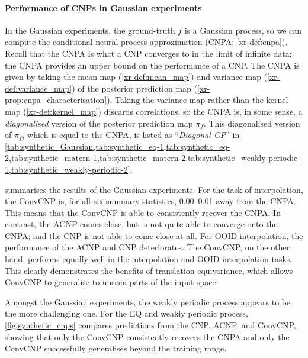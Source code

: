 \documentclass[12pt, twoside]{report}
\newcommand{\xrprefix}[1]{xr-#1}
\begin{document}
\afterpage{\FloatBarrier}

\paragraph{Performance of CNPs in Gaussian experiments}
In the Gaussian experiments, the ground-truth $f$ is a Gaussian process, so we can compute the conditional neural process approximation (CNPA; \cref{\xrprefix{def:cnpa}}).
Recall that the CNPA is what a CNP converges to in the limit of infinite data;
the CNPA provides an upper bound on the performance of a CNP.
The CNPA is given by taking the mean map (\cref{\xrprefix{def:mean_map}}) and variance map (\cref{\xrprefix{def:variance_map}}) of the posterior prediction map (\cref{\xrprefix{prop:cnpa_characterisation}}). 
Taking the variance map rather than the kernel map (\cref{\xrprefix{def:kernel_map}}) discards correlations,
so the CNPA is, in some sense, a \emph{diagonalised} version of the posterior prediction map $\pi_f$.
This diagonalised version of $\pi_f$, which is equal to the CNPA, is listed as ``\emph{Diagonal GP}'' in \cref{tab:synthetic_Gaussian,tab:synthetic_eq-1,tab:synthetic_eq-2,tab:synthetic_matern-1,tab:synthetic_matern-2,tab:synthetic_weakly-periodic-1,tab:synthetic_weakly-periodic-2}.

 summarises the results of the Gaussian experiments.
For the task of interpolation, the ConvCNP is, for all six summary statistics, 0.00--0.01 away from the CNPA.
This means that the ConvCNP is able to consistently recover the CNPA.
In contrast, the ACNP comes close, but is not quite able to converge onto the CNPA;
and the CNP is not able to come close at all.
%
For OOID interpolation, the performance of the ACNP and CNP deteriorates.
The ConvCNP, on the other hand, performs equally well in the interpolation and OOID interpolation tasks.
This clearly demonstrates the benefits of translation equivariance,
which allows ConvCNP to generalise to unseen parts of the input space. 

Amongst the Gaussian experiments, the weakly periodic process appears to be the more challenging one.
For the EQ and weakly periodic process, \cref{fig:synthetic_cnps} compares predictions from the CNP, ACNP, and ConvCNP, showing that only the ConvCNP consistently recovers the CNPA and only the ConvCNP successfully generalises beyond the training range. 
\end{document}
